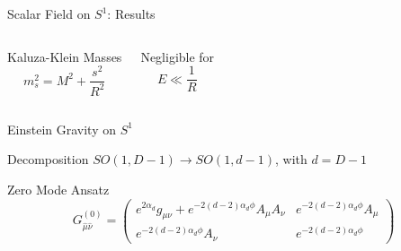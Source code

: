 \begin{frame}{Scalar Field on \texorpdfstring{$S^1$}{S1}: Results}
	\begin{columns}
		\begin{block}{Kaluza-Klein Masses}
			\begin{equation*}
				m^2_s = M^2 + \frac{s^2}{R^2}
			\end{equation*}
		\end{block}
		\begin{block}{Negligible for}
			\begin{equation*}
				E \ll \frac{1}{R}
			\end{equation*}
		\end{block}
	\end{columns}
\end{frame}

\begin{frame}{Einstein Gravity on \texorpdfstring{$S^1$}{S1}}
	\begin{exampleblock}{Decomposition \texorpdfstring{$SO(1,D-1) \to SO(1,d-1)$, with $d = D-1$}{Representations}}
		\begin{table}[c]
			\scalebox{0.96}{
				
			}
		\end{table}
	\end{exampleblock}
	\begin{block}{Zero Mode Ansatz}
		\begin{equation*}
			G^{(0)}_{\hat{\mu}\hat{\nu}} =
			\begin{pmatrix}
				e^{2\alpha_d} g_{\mu\nu} + e^{-2(d-2)\alpha_d \phi} A_\mu A_\nu & e^{-2(d-2)\alpha_d \phi} A_\mu \\
				e^{-2(d-2)\alpha_d \phi} A_\nu                                  & e^{-2(d-2)\alpha_d \phi}
			\end{pmatrix}
		\end{equation*}
	\end{block}
\end{frame}

